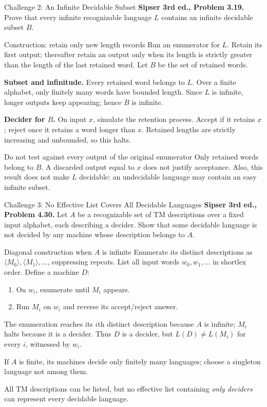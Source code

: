 \documentclass[10pt]{beamer}
\begin{document}
\begin{frame}{Challenge 2: An Infinite Decidable Subset}
  \small
  \textbf{Sipser 3rd ed., Problem 3.19.} Prove that every infinite
  recognizable language $L$ contains an infinite decidable subset $B$.
  \begin{block}{Construction: retain only new length records}
    Run an enumerator for $L$. Retain its first output; thereafter retain
    an output only when its length is strictly greater than the length of
    the last retained word. Let $B$ be the set of retained words.
  \end{block}
  \textbf{Subset and infinitude.} Every retained word belongs to $L$.
  Over a finite alphabet, only finitely many words have bounded length.
  Since $L$ is infinite, longer outputs keep appearing; hence $B$ is infinite.
  \par\smallskip
  \textbf{Decider for $B$.} On input $x$, simulate the retention process.
  Accept if it retains $x$; reject once it retains a word longer than $x$.
  Retained lengths are strictly increasing and unbounded, so this halts.
  \begin{alertblock}{Do not test against every output of the original enumerator}
    Only retained words belong to $B$. A discarded output equal to $x$
    does not justify acceptance. Also, this result does not make $L$
    decidable: an undecidable language may contain an easy infinite subset.
  \end{alertblock}
\end{frame}

\begin{frame}{Challenge 3: No Effective List Covers All Decidable Languages}
  \small
  \textbf{Sipser 3rd ed., Problem 4.30.} Let $A$ be a recognizable set
  of TM descriptions over a fixed input alphabet, each describing a decider.
  Show that some decidable
  language is not decided by any machine whose description belongs to $A$.
  \begin{block}{Diagonal construction when $A$ is infinite}
    Enumerate its distinct descriptions as $\langle M_0\rangle,
    \langle M_1\rangle,\ldots$, suppressing repeats. List all input words
    $w_0,w_1,\ldots$ in shortlex order. Define a machine $D$:
    \begin{enumerate}
      \item On $w_i$, enumerate until $M_i$ appears.
      \item Run $M_i$ on $w_i$ and reverse its accept/reject answer.
    \end{enumerate}
  \end{block}
  The enumeration reaches its $i$th distinct description because $A$ is
  infinite; $M_i$ halts because it is a decider. Thus $D$ is a decider,
  but $L(D)\ne L(M_i)$ for every $i$, witnessed by $w_i$.
  \par\smallskip
  If $A$ is finite, its machines decide only finitely many languages;
  choose a singleton language not among them.
  \par\smallskip
  All TM descriptions can be listed, but no effective list containing
  \emph{only deciders} can represent every decidable language.
\end{frame}
\end{document}
